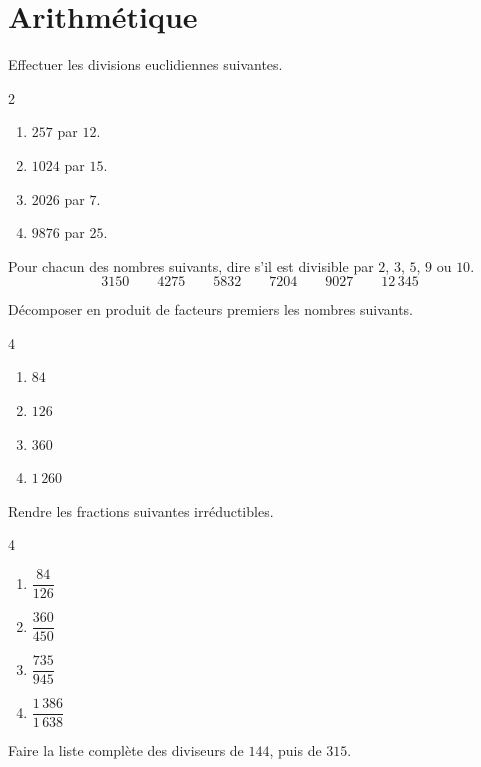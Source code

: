 \documentclass[a4paper,10pt]{report}
\begin{document}
\pagestyle{empty}
\section*{Arithmétique}

\begin{ex}
Effectuer les divisions euclidiennes suivantes.
\begin{multicols}{2}
\begin{enumerate}
\item $257$ par $12$.
\item $1024$ par $15$.
\item $2026$ par $7$.
\item $9876$ par $25$.
\end{enumerate}
\end{multicols}
\end{ex}

\begin{ex}
Pour chacun des nombres suivants, dire s'il est divisible par $2$, $3$, $5$, $9$ ou $10$.
\[
3150 \qquad 4275 \qquad 5832 \qquad 7204 \qquad 9027 \qquad 12\,345
\]
\end{ex}

\begin{ex}
Décomposer en produit de facteurs premiers les nombres suivants.
\begin{multicols}{4}
\begin{enumerate}
\item $84$
\item $126$
\item $360$
\item $1\,260$
\end{enumerate}
\end{multicols}
\end{ex}

\begin{ex}
Rendre les fractions suivantes irréductibles.
\begin{multicols}{4}
\begin{enumerate}
\item $\dfrac{84}{126}$
\item $\dfrac{360}{450}$
\item $\dfrac{735}{945}$
\item $\dfrac{1\,386}{1\,638}$
\end{enumerate}
\end{multicols}
\end{ex}

\begin{ex}
Faire la liste complète des diviseurs de $144$, puis de $315$.

\medskip
\noindent\grandscarreaux{\linewidth}{4cm}
\end{ex}
\end{document}

